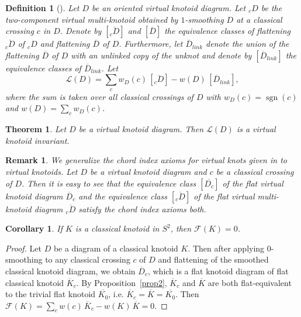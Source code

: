 \documentclass[11pt]{amsart}
\theoremstyle{noparens}
\newtheorem{theorem}{Theorem}[section]
\newtheorem{corollary}{Corollary}[section]
\newtheorem{remark}{Remark}[section]
\newtheorem{definition}{Definition}[section]
\numberwithin{equation}{section}
\numberwithin{equation}{section}
\begin{document}
\begin{definition} [\cite{Pet}] \label{def3.6}
{\rm 
Let $D$ be an oriented virtual knotoid diagram. Let ${}_{c}D$ be the two-component virtual multi-knotoid obtained by $1$-smoothing $D$ at a classical crossing $c$ in $D$. Denote by $[\overline{{}_cD}]$ and $[\overline{D}]$ the equivalence classes of flattening $\overline{{}_cD}$ of ${}_cD$ and flattening $\overline{D}$ of $D$. Furthermore, let $\overline{D}_{link}$ denote the union of the flattening $\overline{D}$ of $D$ with an unlinked copy of the unknot and denote by $[\overline{D}_{link}]$ the equivalence classes of $\overline{D}_{link}$. Let
\begin{equation}
\mathcal{L}(D)= \sum_c w_{D} (c) \, [\overline{{}_cD}] - w(D)  \, [\overline{D}_{link}], \label{eqn:defL}
\end{equation}
where the sum is taken over all classical crossings of $D$ with $w_{D}(c) = \operatorname{sgn} (c)$ and $\displaystyle w(D) = \sum_c w_{D}(c)$.}  
\end{definition}

\begin{theorem} \cite{Pet}
Let $D$ be a virtual knotoid diagram. Then $\mathcal{L} (D)$ is a virtual knotoid invariant. 
\end{theorem}

\begin{remark}\label{re1} We generalize the chord index axioms for virtual knots given in \cite{Che} to virtual knotoids.  Let $D$ be a virtual knotoid diagram and $c$ be a classical crossing of $D$. Then it is easy to see that the equivalence class $[\overline{D_c}]$ of the flat virtual knotoid diagram $\overline{D}_c$ and the equivalence class $[\overline{{}_cD}]$ of the flat virtual multi-knotoid diagram $\overline{{}_cD}$ satisfy the chord index axioms both. 
\end{remark}

\begin{corollary}
If $K$ is a classical knotoid in $S^2$, then $\mathcal{F} (K)=0$.
\end{corollary}

\begin{proof} 
Let $D$ be a diagram of a classical knotoid $K$. Then after applying 0-smoothing to any classical crossing $c$ of $D$ and flattening of the smoothed classical knotoid diagram, we obtain $\overline{D}_{c}$, which is a flat knotoid diagram of flat classical knotoid $\overline{K}_c$. By Proposition~\ref{prop2}, $\overline{K}_{c}$ and $\overline{K}$ are both flat-equivalent to the trivial flat knotoid $\overline{K_0}$, i.e. $\overline{K}_{c}=\overline{K} = \overline{K_0}$. Then $\mathcal{F} (K) = \sum_{c} w (c) \, \overline{K}_{c}- w (K) \, \overline{K} = 0$.
\end{proof}
\end{document}
